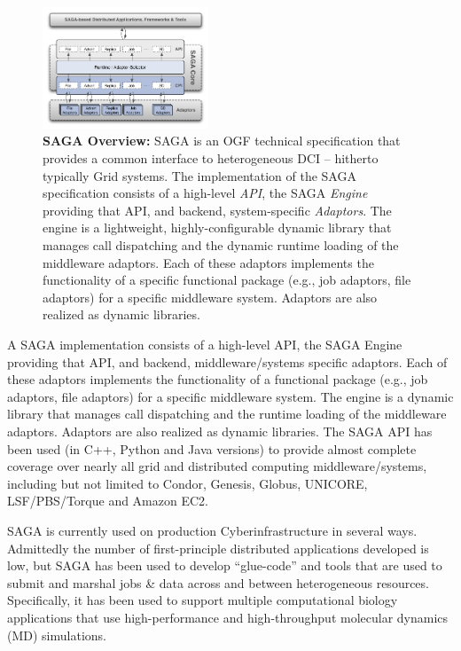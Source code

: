 \documentclass{sig-alternate}
\begin{document}
\begin{figure}[t]
\centering
\includegraphics[width=0.44\textwidth]{./figs/saga-architecture-1}
\caption{\textbf{SAGA Overview: } SAGA is an OGF technical
  specification that provides a common interface to heterogeneous DCI
  -- hitherto typically Grid systems.  The implementation of the
  SAGA\cite{saga_url} specification consists of a high-level {\it
    API}, the SAGA {\it Engine} providing that API, and backend,
  system-specific {\it Adaptors}.  The engine is a lightweight,
  highly-configurable dynamic library that manages call dispatching
  and the dynamic runtime loading of the middleware adaptors.  Each of
  these adaptors implements the functionality of a specific functional
  package (e.g., job adaptors, file adaptors) for a specific
  middleware system. Adaptors are also realized as dynamic libraries.}
 \label{fig:saga-overview}
\end{figure}

A SAGA implementation consists of a high-level API, the SAGA
Engine providing that API, and backend, middleware/systems specific
adaptors. Each of these adaptors implements the functionality of
a functional package (e.g., job adaptors, file adaptors) for a
specific middleware system. The engine is a dynamic library that
manages call dispatching and the runtime loading of the middleware
adaptors. Adaptors are also realized as dynamic libraries. The SAGA
API has been used (in C++, Python and Java versions) to provide almost
complete coverage over nearly all grid and distributed computing
middleware/systems, including but not limited to Condor, Genesis,
Globus, UNICORE, LSF/PBS/Torque and Amazon EC2.

SAGA is currently used on production Cyberinfrastructure in several
ways.  Admittedly the number of first-principle distributed
applications developed is low, but SAGA has been used to develop
``glue-code'' and tools that are used to submit and marshal jobs \&
data across and between heterogeneous resources. Specifically, it has
been used to support multiple computational biology applications that
use high-performance and high-throughput molecular dynamics (MD)
simulations.
\end{document}
